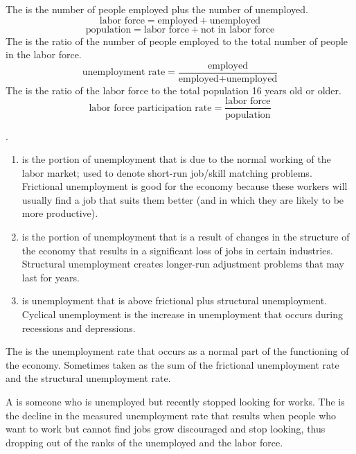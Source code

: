 \documentclass{article}
\begin{document}
The  is the number of people employed plus the number of unemployed. $$\textrm{labor force}=\textrm{employed}+\textrm{unemployed}$$ $$\textrm{population}=\textrm{labor force}+\textrm{not in labor force}$$ The  is the ratio of the number of people employed to the total number of people in the labor force. $$\textrm{unemployment rate} = \frac{\textrm{employed}}{\textrm{employed} + \textrm{unemployed}}$$ The  is the ratio of the labor force to the total population 16 years old or older. $$\textrm{labor force participation rate} = \frac{\textrm{labor force}}{\textrm{population}}$$

\begin{definition}.
  \begin{enumerate}
    \item {} is the portion of unemployment that is due to the normal working of the labor market; used to denote short-run job/skill matching problems. Frictional unemployment is good for the economy because these workers will usually find a job that suits them better (and in which they are likely to be more productive). 
    \item {} is the portion of unemployment that is a result of changes in the structure of the economy that results in a significant loss of jobs in certain industries. Structural unemployment creates longer-run adjustment problems that may last for years.  
    \item {} is unemployment that is above frictional plus structural unemployment. Cyclical unemployment is the increase in unemployment that occurs during recessions and depressions. 
  \end{enumerate}
  The  is the unemployment rate that occurs as a normal part of the functioning of the economy. Sometimes taken as the sum of the frictional unemployment rate and the structural unemployment rate. 
\end{definition}
A  is someone who is unemployed but recently stopped looking for works. The  is the decline in the measured unemployment rate that results when people who want to work but cannot find jobs grow discouraged and stop looking, thus dropping out of the ranks of the unemployed and the labor force. \\ 
\end{document}

